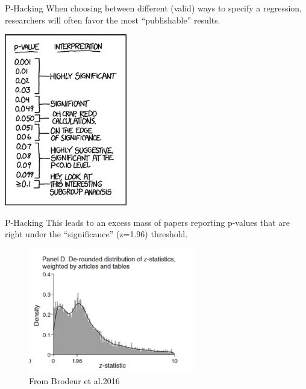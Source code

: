 \documentclass[
  ignorenonframetext,
]{beamer}
\begin{document}
\begin{frame}{P-Hacking}
\protect\hypertarget{p-hacking}{}
When choosing between different (valid) ways to specify a regression,
researchers will often favor the most ``publishable'' results.

\centering \includegraphics[width=0.4\textwidth,height=\textheight]{"images/phackingcomic.png"}
\end{frame}

\begin{frame}{P-Hacking}
\protect\hypertarget{p-hacking-1}{}
This leads to an excess mass of papers reporting p-values that are right
under the ``significance'' (z=1.96) threshold.

\begin{figure}
\centering
\includegraphics[width=0.65\textwidth,height=\textheight]{"images/brodeuretal.png"}
\caption{From Brodeur et al.2016}
\end{figure}
\end{frame}
\end{document}
